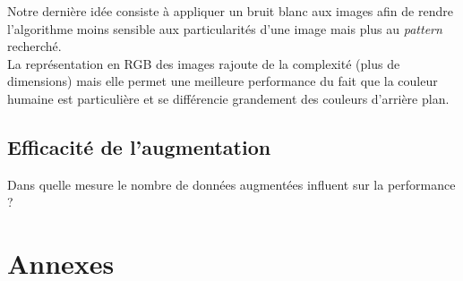 \documentclass[a4paper,11pt]{article}
\begin{document}
	Notre dernière idée consiste à appliquer un bruit blanc aux images afin de rendre
	l'algorithme moins sensible aux particularités d'une image mais plus au \textit{pattern}
	recherché.\\

	La représentation en RGB des images rajoute de la complexité (plus de dimensions) mais
	elle permet une meilleure performance du fait que la couleur humaine est particulière et se
	différencie grandement des couleurs d'arrière plan.

    \subsection{Efficacité de l'augmentation}

	Dans quelle mesure le nombre de données augmentées influent sur la performance ?

\section{Annexes}


\end{document}

